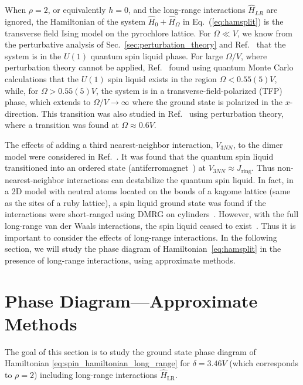 \documentclass[twocolumn,superscriptaddress,amsmath,amssymb,aps,prx,nofootinbib]{revtex4-2}
\begin{document}
  When $\rho = 2$, or equivalently $h = 0$, and the long-range interactions $\hat{H}_{LR}$ are ignored, the Hamiltonian of the system $\hat{H}_0 + \hat{H}_{\Omega}$ in Eq.\ (\ref{eq:hamsplit}) is the transverse field Ising model on the pyrochlore lattice.  For $\Omega \ll V$, we know from the perturbative analysis of Sec.~\ref{sec:perturbation_theory} and Ref.~\cite{Sikora2009} that the system is in the $U(1)$ quantum spin liquid phase. For large $\Omega/V$, where  perturbation theory cannot be applied, Ref.~\cite{emonts2018monte} found using quantum Monte Carlo calculations that the $U(1)$ spin liquid exists in the region $\Omega < 0.55(5) V$, while, for $\Omega > 0.55(5) V$, the system is in a transverse-field-polarized (TFP) phase, which extends to $\Omega/V \rightarrow \infty$ where the ground state is polarized in the $x$-direction. This transition was also studied in Ref.~\cite{rochner2016spin} using perturbation theory, where a transition was found at $\Omega\approx 0.6 V$. 



  The effects of adding a third nearest-neighbor interaction, $V_{3NN}$, to the dimer model were considered in Ref.~\cite{pace2021}. It was found that the quantum spin liquid transitioned into an ordered state (antiferromagnet~\cite{chen2016magnetic}) at $V_{3NN} \approx J_{\text{ring}}$. 
  Thus non-nearest-neighbor interactions can destabilize the quantum spin liquid.
  In fact, in a 2D model with neutral atoms located on the bonds of a kagome lattice (same as the sites of a ruby lattice), a spin liquid ground state was found if the interactions were short-ranged using DMRG on cylinders~\cite{verresen2021,semeghini2021}. However, with the full long-range van der Waals interactions, the spin liquid ceased to exist~\cite{verresen2021,semeghini2021}. Thus it is important to consider the effects of long-range interactions. In the following section, we will study the phase diagram of Hamiltonian~\eqref{eq:hamsplit} in the presence of long-range interactions, using approximate methods. 

\section{Phase Diagram---Approximate Methods}\label{sec:meanfield}
The goal of this section is to study the ground state phase diagram of Hamiltonian \eqref{eq:spin_hamiltonian_long_range} for $\delta = 3.46 V$ (which corresponds to $\rho = 2$) including long-range interactions $\hat{H}_{\text{LR}}$.
\end{document}
